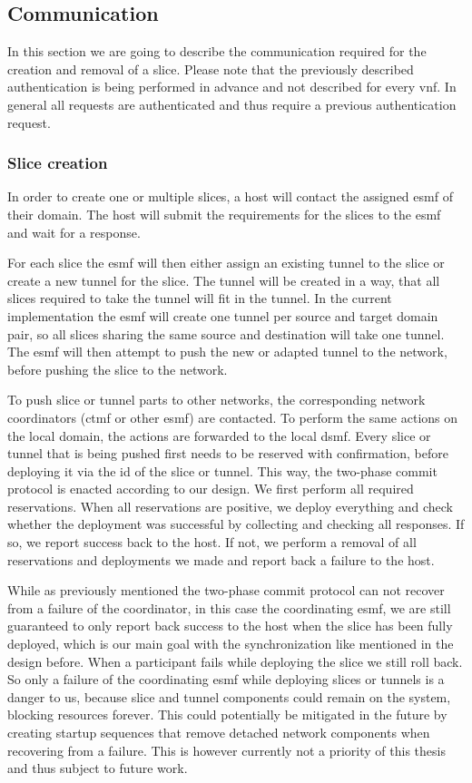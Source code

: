 \subsection{Communication}
\label{impl_communication}
In this section we are going to describe the communication required for the creation and removal of a slice. Please note that the previously described authentication is being performed in advance and not described for every \acrshort{vnf}. In general all requests are authenticated and thus require a previous authentication request.

\subsubsection{Slice creation}
In order to create one or multiple slices, a host will contact the assigned \acrshort{esmf} of their domain. The host will submit the requirements for the slices to the \acrshort{esmf} and wait for a response.

For each slice the \acrshort{esmf} will then either assign an existing tunnel to the slice or create a new tunnel for the slice. The tunnel will be created in a way, that all slices required to take the tunnel will fit in the tunnel. In the current implementation the \acrshort{esmf} will create one tunnel per source and target domain pair, so all slices sharing the same source and destination will take one tunnel. The \acrshort{esmf} will then attempt to push the new or adapted tunnel to the network, before pushing the slice to the network.

To push slice or tunnel parts to other networks, the corresponding network coordinators (\acrshort{ctmf} or other \acrshort{esmf}) are contacted. To perform the same actions on the local domain, the actions are forwarded to the local \acrshort{dsmf}. Every slice or tunnel that is being pushed first needs to be reserved with confirmation, before deploying it via the id of the slice or tunnel. This way, the two-phase commit protocol is enacted according to our design. We first perform all required reservations. When all reservations are positive, we deploy everything and check whether the deployment was successful by collecting and checking all responses. If so, we report success back to the host. If not, we perform a removal of all reservations and deployments we made and report back a failure to the host.

While as previously mentioned the two-phase commit protocol can not recover from a failure of the coordinator, in this case the coordinating \acrshort{esmf}, we are still guaranteed to only report back success to the host when the slice has been fully deployed, which is our main goal with the synchronization like mentioned in the design before. When a participant fails while deploying the slice we still roll back. So only a failure of the coordinating \acrshort{esmf} while deploying slices or tunnels is a danger to us, because slice and tunnel components could remain on the system, blocking resources forever. This could potentially be mitigated in the future by creating startup sequences that remove detached network components when recovering from a failure. This is however currently not a priority of this thesis and thus subject to future work.

